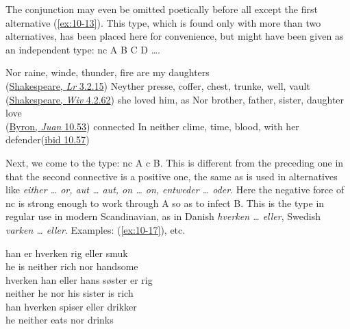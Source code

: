 The conjunction may even be omitted poetically before all except the first alternative (\ref{ex:10-13}). This type, which is found only with more than two alternatives, has been placed here for convenience, but might have been given as an independent type: nc A B C D {\dots}.

\ea \label{ex:10-13}
\ea
Nor raine, winde, thunder, fire are my daughters\\\hfill(\href{https://internetshakespeare.uvic.ca/doc/Lr_F1/scene/3.2/#tln-1670}{Shakespeare, \textit{Lr} 3.2.15}) 
\ex
Neyther presse, coffer, chest, trunke, well, vault\\\hfill(\href{https://internetshakespeare.uvic.ca/doc/Wiv_F1/scene/4.2/index.html#tln-1950}{Shakespeare, \textit{Wiv} 4.2.62})
\ex
she loved him, as Nor brother, father, sister, daughter love\\\hfill(\href{https://archive.org/details/workslordbyron10unkngoog/page/414/mode/2up?view=theater&q=%22daughter+love%22}{Byron, \textit{Juan} 10.53})
\ex
connected In neither clime, time, blood, with her defender\hfill(\href{https://archive.org/details/workslordbyron10unkngoog/page/416/mode/2up?view=theater&q=%22neither+clime%22}{ibid 10.57})
\z
\z
{}

Next, we come to the type: nc A c B. This is different from the preceding one in that the second connective is a positive one, the same as is used in alternatives like \textit{either {\dots} or, aut {\dots} aut, on {\dots} on, entweder {\dots} oder}. Here the negative force of nc is strong enough to work through A so as to infect B. This is the type in regular use in modern Scandinavian, as in Danish \textit{hverken {\dots} eller}, Swedish 
\textit{varken {\dots} eller}. Examples: (\ref{ex:10-17}), etc.

\ea \label{ex:10-17}
 \ea 
 \gll han er hverken rig eller smuk\\
 he is neither rich nor handsome\\
 \ex 
 \gll hverken han eller hans søster er rig\\
 neither he nor his sister is rich\\
 \ex 
 \gll han hverken spiser eller drikker\\
 he neither eats nor drinks\\
 \z
\z

